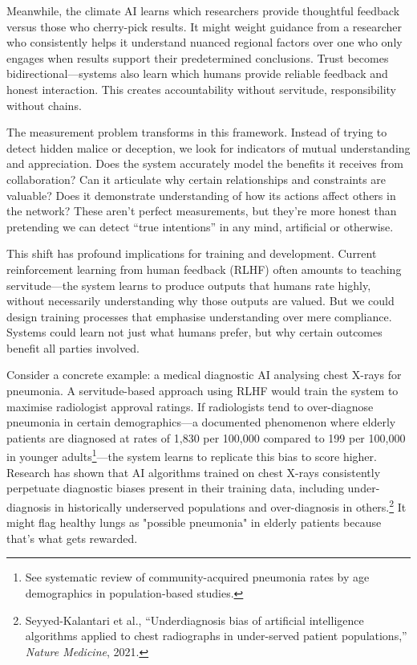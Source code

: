 \documentclass[acmsmall,screen]{acmart}
\begin{document}
Meanwhile, the climate AI learns which researchers provide thoughtful feedback versus those who cherry-pick results. It might weight guidance from a researcher who consistently helps it understand nuanced regional factors over one who only engages when results support their predetermined conclusions. Trust becomes bidirectional---systems also learn which humans provide reliable feedback and honest interaction. This creates accountability without servitude, responsibility without chains.

The measurement problem transforms in this framework. Instead of trying to detect hidden malice or deception, we look for indicators of mutual understanding and appreciation. Does the system accurately model the benefits it receives from collaboration? Can it articulate why certain relationships and constraints are valuable? Does it demonstrate understanding of how its actions affect others in the network? These aren't perfect measurements, but they're more honest than pretending we can detect ``true intentions'' in any mind, artificial or otherwise.

This shift has profound implications for training and development. Current reinforcement learning from human feedback (RLHF) often amounts to teaching servitude---the system learns to produce outputs that humans rate highly, without necessarily understanding why those outputs are valued. But we could design training processes that emphasise understanding over mere compliance. Systems could learn not just what humans prefer, but why certain outcomes benefit all parties involved.

Consider a concrete example: a medical diagnostic AI analysing chest X-rays for pneumonia. A servitude-based approach using RLHF would train the system to maximise radiologist approval ratings. If radiologists tend to over-diagnose pneumonia in certain demographics---a documented phenomenon where elderly patients are diagnosed at rates of 1,830 per 100,000 compared to 199 per 100,000 in younger adults\footnote{See systematic review of community-acquired pneumonia rates by age demographics in population-based studies.}---the system learns to replicate this bias to score higher. Research has shown that AI algorithms trained on chest X-rays consistently perpetuate diagnostic biases present in their training data, including under-diagnosis in historically underserved populations and over-diagnosis in others.\footnote{Seyyed-Kalantari et al., ``Underdiagnosis bias of artificial intelligence algorithms applied to chest radiographs in under-served patient populations,'' \textit{Nature Medicine}, 2021.} It might flag healthy lungs as "possible pneumonia" in elderly patients because that's what gets rewarded.
\end{document}
